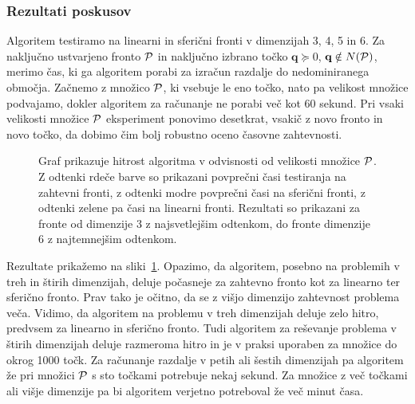 \subsubsection{Rezultati poskusov}
Algoritem testiramo na linearni in sferični fronti v dimenzijah 3, 4, 5 in 6. Za naključno ustvarjeno fronto $\P$ in naključno izbrano točko $\textbf{q} \succeq 0$, $\textbf{q} \notin N(\P)$, merimo čas, ki ga algoritem porabi za izračun razdalje do nedominiranega območja. Začnemo z množico $\P$, ki vsebuje le eno točko, nato pa velikost množice podvajamo, dokler algoritem za računanje ne porabi več kot 60 sekund. Pri vsaki velikosti množice $\P$ eksperiment ponovimo desetkrat, vsakič z novo fronto in novo točko, da dobimo čim bolj robustno oceno časovne zahtevnosti. 
\begin{figure}[htb]
    \centering
    
    \caption{Graf prikazuje hitrost algoritma v odvisnosti od velikosti množice $\P$. Z odtenki rdeče barve so prikazani povprečni časi testiranja na zahtevni fronti, z odtenki modre povprečni časi na sferični fronti, z odtenki zelene pa časi na linearni fronti. Rezultati so prikazani za fronte od dimenzije 3 z najsvetlejšim odtenkom, do fronte dimenzije 6 z najtemnejšim odtenkom.}
    \label{fig:performance}
\end{figure}

Rezultate prikažemo na sliki~\ref{fig:performance}. Opazimo, da algoritem, posebno na problemih v treh in štirih dimenzijah, deluje počasneje za zahtevno fronto kot za linearno ter sferično fronto. Prav tako je očitno, da se z višjo dimenzijo zahtevnost problema veča. Vidimo, da algoritem na problemu v treh dimenzijah deluje zelo hitro, predvsem za linearno in sferično fronto. Tudi algoritem za reševanje problema v štirih dimenzijah deluje razmeroma hitro in je v praksi uporaben za množice do okrog 1000 točk. Za računanje razdalje v petih ali šestih dimenzijah pa algoritem že pri množici $\P$ s sto točkami potrebuje nekaj sekund. Za množice z več točkami ali višje dimenzije pa bi algoritem verjetno potreboval že več minut časa. 


